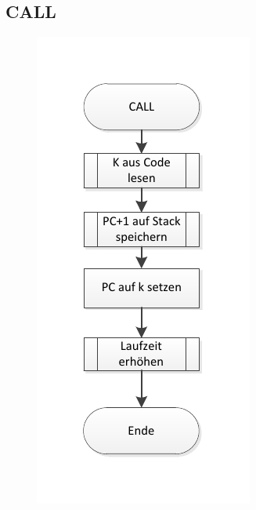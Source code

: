\newpage
\subsection{CALL}



\begin{figure}[h]
\centering
\includegraphics[scale=0.7]{Diag/CALL.pdf}
\end{figure}
